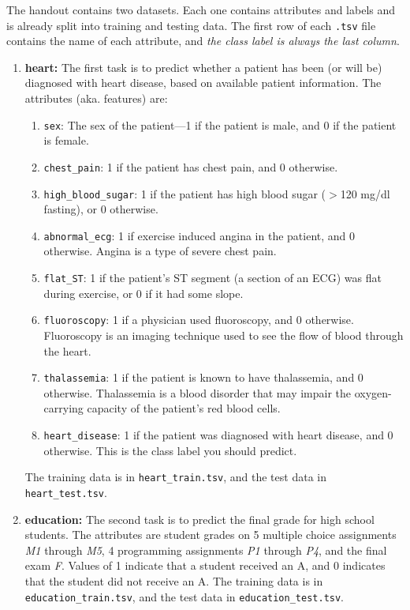\documentclass[11pt,addpoints,answers]{exam}
\begin{document}
The handout contains two datasets. Each one contains attributes and labels and is already split into training and testing data. The first row of each \lstinline{.tsv} file contains the name of each attribute, and \emph{the class label is always the last column}.

\begin{enumerate}
\item \textbf{heart:}
    The first task is to predict whether a patient has been (or will be) diagnosed with heart disease, based on available patient information. The attributes (aka. features) are: 
    \begin{enumerate}
        \item \lstinline{sex}: The sex of the patient---1 if the patient is male, and 0 if the patient is female.
        \item \lstinline{chest_pain}: 1 if the patient has chest pain, and 0 otherwise.
        \item \lstinline{high_blood_sugar}: 1 if the patient has high blood sugar ($>$120 mg/dl fasting), or 0 otherwise.
        \item \lstinline{abnormal_ecg}: 1 if exercise induced angina in the patient, and 0 otherwise. Angina is a type of severe chest pain.
        \item \lstinline{flat_ST}: 1 if the patient's ST segment (a section of an ECG) was flat during exercise, or 0 if it had some slope.
        \item \lstinline{fluoroscopy}: 1 if a physician used fluoroscopy, and 0 otherwise. Fluoroscopy is an imaging technique used to see the flow of blood through the heart.
        \item \lstinline{thalassemia}: 1 if the patient is known to have thalassemia, and 0 otherwise. Thalassemia is a blood disorder that may impair the oxygen-carrying capacity of the patient's red blood cells.
        \item \lstinline{heart_disease}: 1 if the patient was diagnosed with heart disease, and 0 otherwise. This is the class label you should predict.
    \end{enumerate}
    The training data is in \lstinline{heart_train.tsv}, and the test data in \lstinline{heart_test.tsv}.
\item \textbf{education:}
    The second task is to predict the final grade for high school students. The attributes are student grades on 5 multiple choice assignments \emph{M1} through \emph{M5}, 4 programming assignments \emph{P1} through \emph{P4}, and the final exam \emph{F}. Values of 1 indicate that a student received an A, and 0 indicates that the student did not receive an A. The training data is in \newline \lstinline{education_train.tsv}, and the test data in \lstinline{education_test.tsv}.

\end{enumerate}
\end{document}
